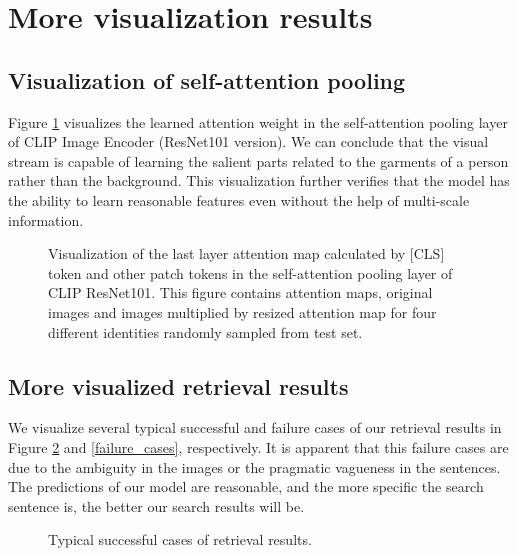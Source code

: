 \documentclass{bmvc2k}
\begin{document}
\vspace*{-4mm}
\section{More visualization results}
\subsection{Visualization of self-attention pooling} Figure \ref{vis_sa} visualizes the learned attention weight in the self-attention pooling layer of CLIP Image Encoder (ResNet101 version). We can conclude that the visual stream is capable of learning the salient parts related to the garments of a person rather than the background. This visualization further verifies that the model has the ability to learn reasonable features even without the help of multi-scale information.
\begin{figure}[htbp]
\centering
{}
\caption{Visualization of the last layer attention map calculated by [CLS] token and other patch tokens in the self-attention pooling layer of CLIP ResNet101. This figure contains attention maps, original images and images multiplied by resized attention map for four different identities randomly sampled from test set.}
\label{vis_sa}
\end{figure}

\subsection{More visualized retrieval results} We visualize several typical successful and failure cases of our retrieval results in Figure \ref{success_cases} and \ref{failure_cases}, respectively. It is apparent that this failure cases are due to the ambiguity in the images or the 
pragmatic vagueness in the sentences. The predictions of our model are reasonable, and the more specific the search sentence is, the better our search results will be.

\begin{figure}[htbp]
\centering
{}
\caption{Typical successful cases of retrieval results.}
\label{success_cases}
\end{figure}
\end{document}
